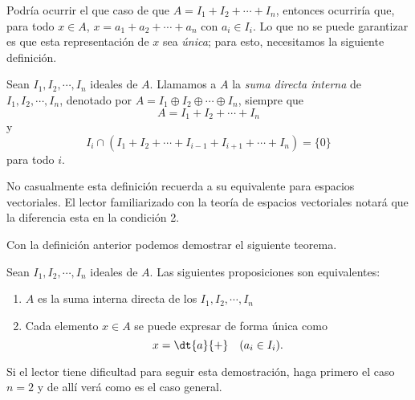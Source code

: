Podría ocurrir el que caso de que $A = I_1+I_2+\cdots+I_n$, entonces ocurriría que, para todo $x\in A$, $x = a_1+a_2+\cdots+a_n$ con $a_i \in I_i$. Lo que no se puede garantizar es que esta representación de $x$ sea \textit{única}; para esto, necesitamos la siguiente definición.
\begin{defi} 
	Sean $I_1,I_2,\cdots,I_n$ ideales de $A$. Llamamos a $A$ la \textit{suma directa interna} de $I_1,I_2,\cdots,I_n$, denotado por $A = I_1 \oplus I_2\oplus \cdots \oplus I_n$, siempre que
	\[ A = I_1+I_2+\cdots+I_n \]
	y 
	\[ I_i \cap (I_1+I_2+\cdots+I_{i-1}+I_{i+1}+\cdots+I_n) = \{0\} \]
	para todo $i$.
\end{defi} 
\begin{nota}
	No casualmente esta definición recuerda a su equivalente para espacios vectoriales. El lector familiarizado con la teoría de espacios vectoriales notará que la diferencia esta en la condición 2.
\end{nota}
Con la definición anterior podemos demostrar el siguiente teorema.
\begin{teo}
	Sean $I_1,I_2,\cdots,I_n$ ideales de $A$. Las siguientes proposiciones son equivalentes:
	\begin{enumerate}
		\item $A$ es la suma interna directa de los $I_1,I_2,\cdots,I_n$ 
		\item Cada elemento $x\in A$ se puede expresar de forma única como
		\[ x = \dt{a}{+} \quad (a_i\in I_i). \]
	\end{enumerate}
\end{teo} 
\begin{nota}
	Si el lector tiene dificultad para seguir esta demostración, haga primero el caso $n=2$ y de allí verá como es el caso general.
\end{nota}
